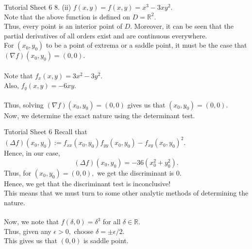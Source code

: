 \documentclass[aspectratio=169]{beamer}
\begin{document}
\begin{frame}{Tutorial Sheet 6}
	8. (ii) $f(x, y)=f(x, y)=x^{3}-3 x y^{2}.$ \\
	Note that the above function is defined on $D = \mathbb{R}^2.$ \\
	Thus, every point is an interior point of $D.$ Moreover, it can be seen that the partial derivatives of all orders exist and are continuous everywhere. \\
	For $(x_0, y_0)$ to be a point of extrema or a saddle point, it must be the case that $(\nabla f)(x_0, y_0) = (0, 0).$ \\~\\
	Note that $f_x(x, y) = 3x^2 - 3y^2.$ \\
	Also, $f_y(x, y) = -6xy.$ \\~\\
	Thus, solving $(\nabla f)(x_0, y_0) = (0, 0)$ gives us that $(x_0, y_0) = (0, 0).$ \\
	Now, we determine the exact nature using the determinant test.
\end{frame}

\begin{frame}{Tutorial Sheet 6}
	Recall that $(\Delta f)\left(x_{0}, y_{0}\right):=f_{x x}\left(x_{0}, y_{0}\right) f_{y y}\left(x_{0}, y_{0}\right)-f_{x y}\left(x_{0}, y_{0}\right)^{2}.$\\
	Hence, in our case,
	\[(\Delta f)(x_0, y_0) = -36(x_0^2 + y_0^2).\] 
	Thus, for $(x_0, y_0) = (0, 0),$ we get the discriminant is $0.$ \\
	Hence, we get that the discriminant test is { inconclusive!} \\
	This means that we must turn to some other analytic methods of determining the nature. \\~\\
	Now, we note that $f(\delta, 0) = \delta^3$ for all $\delta \in \mathbb{R}.$ \\
	Thus, given any $\epsilon > 0,$ choose $\delta = \pm \epsilon/2.$ \\
	This gives us that $(0, 0)$ is saddle point.
\end{frame}
\end{document}
